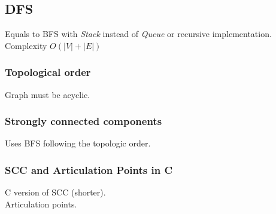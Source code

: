 \subsection{DFS}
Equals to BFS with \textit{Stack} instead of \textit{Queue} or recursive implementation. Complexity $O(|V|+|E|)$\\

\subsubsection{Topological order}
Graph must be acyclic. \\


\subsubsection{Strongly connected components}
Uses BFS following the topologic order. \\


\subsubsection{SCC and Articulation Points in C}
C version of SCC (shorter). \\



Articulation points. \\





